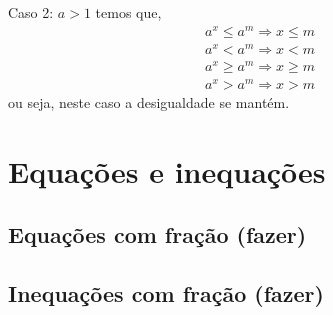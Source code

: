  Caso 2: $a > 1$ temos que,
  \begin{eqnarray*}
 a^x \leq a^m \Rightarrow x \leq m \\
 a^x < a^m \Rightarrow x < m \\
 a^x \geq a^m \Rightarrow x \geq m \\
 a^x > a^m \Rightarrow x > m
 \end{eqnarray*}
 ou seja, neste caso a desigualdade se mantém.
 
  

 \chapter{Equações e inequações}

 \section{Equações com fração (fazer)}
 \section{Inequações com fração (fazer)}

